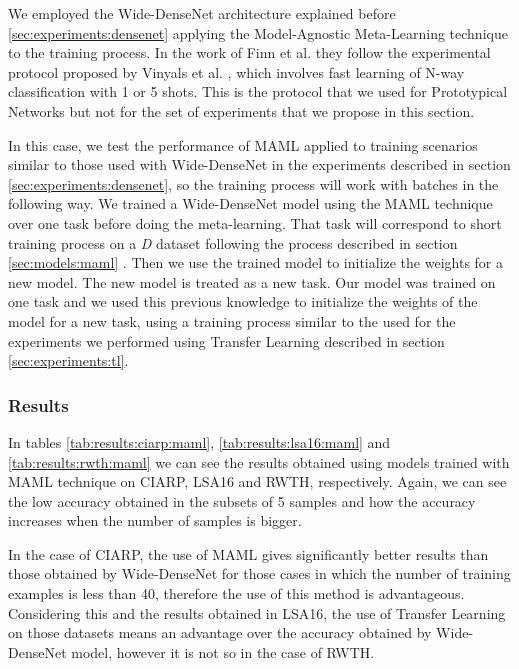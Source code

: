 We employed the Wide-DenseNet architecture explained before \ref{sec:experiments:densenet} applying the Model-Agnostic Meta-Learning technique to the training process. In the work of Finn et al. \cite{DBLP:journals/corr/FinnAL17} they follow the experimental protocol proposed by Vinyals et al. \cite{DBLP:journals/corr/VinyalsBLKW16}, which involves fast learning of N-way classification with 1 or 5 shots. This is the protocol that we used for Prototypical Networks but not for the set of experiments that we propose in this section.

In this case, we test the performance of MAML applied to training scenarios similar to those used with Wide-DenseNet in the experiments described in section \ref{sec:experiments:densenet}, so the training process will work with batches in the following way. We trained a Wide-DenseNet model using the MAML technique over one task before doing the meta-learning. That task will correspond to short training process on a \textit{D} dataset following the process described in section \ref{sec:models:maml} . Then we use the trained model to initialize the weights for a new model. The new model is treated as a new task. Our model was trained on one task and we used this previous knowledge to initialize the weights of the model for a new task, using a training process similar to the used for the experiments we performed using Transfer Learning described in section \ref{sec:experiments:tl}.

\subsubsection{Results}

In tables \ref{tab:results:ciarp:maml}, \ref{tab:results:lsa16:maml} and \ref{tab:results:rwth:maml} we can see the results obtained using models trained with MAML technique on CIARP, LSA16 and RWTH, respectively. Again, we can see the low accuracy obtained in the subsets of 5 samples and how the accuracy increases when the number of samples is bigger.

In the case of CIARP, the use of MAML gives significantly better results than those obtained by Wide-DenseNet for those cases in which the number of training examples is less than 40, therefore the use of this method is advantageous. Considering this and the results obtained in LSA16, the use of Transfer Learning on those datasets means an advantage over the accuracy obtained by Wide-DenseNet model, however it is not so in the case of RWTH. \\

